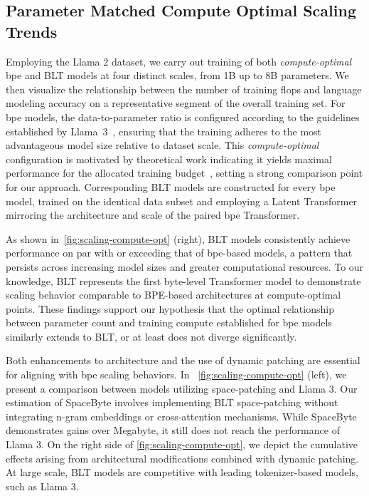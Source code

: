 \subsection{Parameter Matched Compute Optimal Scaling Trends}
\label{section:parameter-matched-scaling}
Employing the Llama 2 dataset, we carry out training of both \textit{compute-optimal} bpe and {\textsc BLT} models at four distinct scales, from 1B up to 8B parameters. We then visualize the relationship between the number of training flops and language modeling accuracy on a representative segment of the overall training set. For bpe models, the data-to-parameter ratio is configured according to the guidelines established by Llama~3~\citep{dubey2024llama}, ensuring that the training adheres to the most advantageous model size relative to dataset scale. This \textit{compute-optimal} configuration is motivated by theoretical work indicating it yields maximal performance for the allocated training budget~\citep{hoffmann2022training}, setting a strong comparison point for our approach. Corresponding {\textsc BLT} models are constructed for every bpe model, trained on the identical data subset and employing a Latent Transformer mirroring the architecture and scale of the paired bpe Transformer.

As shown in~\autoref{fig:scaling-compute-opt} (right), {\textsc BLT} models consistently achieve performance on par with or exceeding that of bpe-based models, a pattern that persists across increasing model sizes and greater computational resources. To our knowledge, {\textsc BLT} represents the first byte-level Transformer model to demonstrate scaling behavior comparable to BPE-based architectures at compute-optimal points. These findings support our hypothesis that the optimal relationship between parameter count and training compute established for bpe models similarly extends to {\textsc BLT}, or at least does not diverge significantly.

Both enhancements to architecture and the use of dynamic patching are essential for aligning with bpe scaling behaviors. In ~\autoref{fig:scaling-compute-opt} (left), we present a comparison between models utilizing space-patching and Llama 3. Our estimation of SpaceByte \citep{slagle2024spacebyte} involves implementing {\textsc BLT} space-patching without integrating n-gram embeddings or cross-attention mechanisms. While SpaceByte demonstrates gains over Megabyte, it still does not reach the performance of Llama 3. On the right side of \autoref{fig:scaling-compute-opt}, we depict the cumulative effects arising from architectural modifications combined with dynamic patching. At large scale, {\textsc BLT} models are competitive with leading tokenizer-based models, such as Llama 3.

